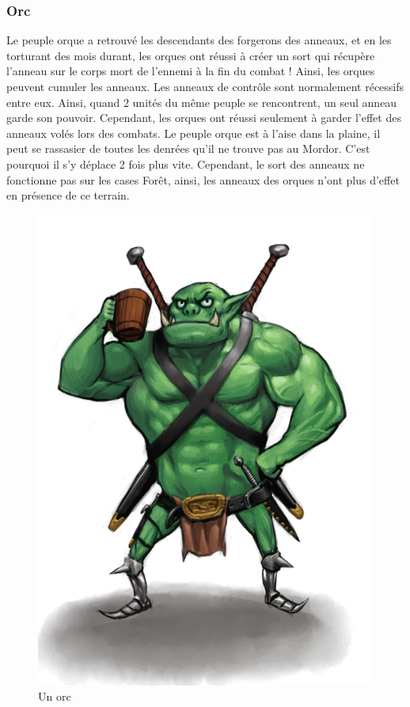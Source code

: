 \subsubsection{Orc}

Le peuple orque a retrouvé les descendants des forgerons des anneaux, et en les torturant des mois durant, les orques ont réussi à créer un sort qui récupère l'anneau sur le corps mort de l'ennemi à la fin du combat ! Ainsi, les orques peuvent cumuler les anneaux.
\newline
\newline
Les anneaux de contrôle sont normalement récessifs entre eux. Ainsi, quand 2 unités du même peuple se rencontrent, un seul anneau garde son pouvoir. Cependant, les orques ont réussi seulement à garder l'effet des anneaux volés lors des combats.
\newline
\newline
Le peuple orque est à l'aise dans la plaine, il peut se rassasier de toutes les denrées qu'il ne trouve pas au Mordor. C'est pourquoi il s'y déplace 2 fois plus vite. 
\newline Cependant, le sort des anneaux ne fonctionne pas sur les cases Forêt, ainsi, les anneaux des orques n'ont plus d'effet en présence de ce terrain.

\begin{figure}[!h]
\centering
\includegraphics[scale=0.10]{img/orc.png}
\caption{Un orc}
\end{figure}

